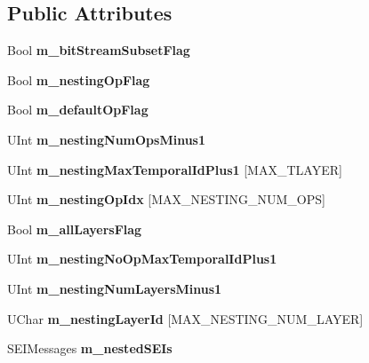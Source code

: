 \subsection*{Public Attributes}
\begin{DoxyCompactItemize}
\item 
\mbox{\label{class_s_e_i_scalable_nesting_a4fe84f6aa8e8664f3e652a6da513aaa9}} 
Bool {\bfseries m\+\_\+bit\+Stream\+Subset\+Flag}
\item 
\mbox{\label{class_s_e_i_scalable_nesting_a8aadb0a218959e89da9c7cd9821dded0}} 
Bool {\bfseries m\+\_\+nesting\+Op\+Flag}
\item 
\mbox{\label{class_s_e_i_scalable_nesting_a59b08fcfb87b2cf0a37d72231488af78}} 
Bool {\bfseries m\+\_\+default\+Op\+Flag}
\item 
\mbox{\label{class_s_e_i_scalable_nesting_a81d68564cc48103461b4c39a89dbe280}} 
U\+Int {\bfseries m\+\_\+nesting\+Num\+Ops\+Minus1}
\item 
\mbox{\label{class_s_e_i_scalable_nesting_a9329f5054c9ab2f353b83ca7131f0408}} 
U\+Int {\bfseries m\+\_\+nesting\+Max\+Temporal\+Id\+Plus1} \mbox{[}M\+A\+X\+\_\+\+T\+L\+A\+Y\+ER\mbox{]}
\item 
\mbox{\label{class_s_e_i_scalable_nesting_ab96bb0f3373e4d5305a9b4d05196839a}} 
U\+Int {\bfseries m\+\_\+nesting\+Op\+Idx} \mbox{[}M\+A\+X\+\_\+\+N\+E\+S\+T\+I\+N\+G\+\_\+\+N\+U\+M\+\_\+\+O\+PS\mbox{]}
\item 
\mbox{\label{class_s_e_i_scalable_nesting_ab5d7480c280af126955b735f6b5712d8}} 
Bool {\bfseries m\+\_\+all\+Layers\+Flag}
\item 
\mbox{\label{class_s_e_i_scalable_nesting_a2c709375eb9ba3569cf890abb727b6e0}} 
U\+Int {\bfseries m\+\_\+nesting\+No\+Op\+Max\+Temporal\+Id\+Plus1}
\item 
\mbox{\label{class_s_e_i_scalable_nesting_a46255cdfb220c46a9c959f2596303832}} 
U\+Int {\bfseries m\+\_\+nesting\+Num\+Layers\+Minus1}
\item 
\mbox{\label{class_s_e_i_scalable_nesting_a8d153462537832c2f6a134b1e50d1b3e}} 
U\+Char {\bfseries m\+\_\+nesting\+Layer\+Id} \mbox{[}M\+A\+X\+\_\+\+N\+E\+S\+T\+I\+N\+G\+\_\+\+N\+U\+M\+\_\+\+L\+A\+Y\+ER\mbox{]}
\item 
\mbox{\label{class_s_e_i_scalable_nesting_a99acb8b03fd8be612aaba4242f68b860}} 
S\+E\+I\+Messages {\bfseries m\+\_\+nested\+S\+E\+Is}
\end{DoxyCompactItemize}
